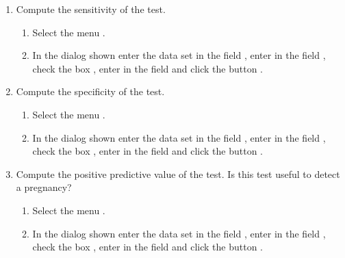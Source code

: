 \begin{enumerate}[leftmargin=*]
\begin{enumerate}
\item Compute the sensitivity of the test. 
\begin{indication}
\begin{enumerate}
\item Select the menu .
\item In the dialog shown enter the data set  in the field , enter
 in the field , check the box , enter
 in the field  and click the button .
\end{enumerate}
\end{indication} 

\item Compute the specificity of the test.
\begin{indication}
\begin{enumerate}
\item Select the menu .
\item In the dialog shown enter the data set  in the field , enter
 in the field , check the box , enter
 in the field  and click the button .
\end{enumerate}
\end{indication} 

\item Compute the positive predictive value of the test. 
Is this test useful to detect a pregnancy? 
\begin{indication}
\begin{enumerate}
\item Select the menu .
\item In the dialog shown enter the data set  in the field , enter
 in the field , check the box , enter
 in the field  and click the button .
\end{enumerate}
\end{indication} 


\end{enumerate}
\end{enumerate}
